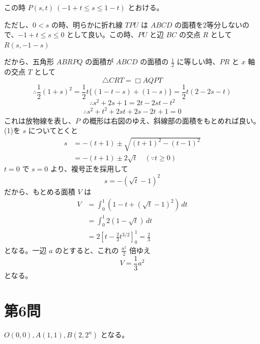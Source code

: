 \documentclass[../main.tex]{subfiles}
\begin{document}
\noindent
この時 $P(s,t) \ (-1+t \le s \le 1-t)$ とおける。

\noindent
ただし、$0 < s$ の時、明らかに折れ線 $TPU$ は $ABCD$ の面積を2等分しないので、$-1+t \le s \le 0$ として良い。この時、$PU$ と辺 $BC$ の交点 $R$ として $R(s, -1-s)$

\noindent
だから、五角形 $ABRPQ$ の面積が $ABCD$ の面積の $\frac{1}{2}$ に等しい時、$PR$ と $x$ 軸の交点 $T$ として
\[
  \triangle CRT = \Box AQPT
\]
\[
  \therefore \frac{1}{2}(1+s)^2 = \frac{1}{2} t \{ (1-t-s) + (1-s) \} = \frac{1}{2} t (2 - 2s - t)
\]
\[
  \therefore s^2 + 2s + 1 = 2t - 2st - t^2
\]
\begin{align}
  \therefore s^2 + t^2 + 2st + 2s - 2t + 1 = 0 \tag{1}
\end{align}
これは放物線を表し、$P$ の概形は右図のゆえ、斜線部の面積をもとめれば良い。(1)を $s$ についてとくと
\begin{align*}
  s &= -(t+1) \pm \sqrt{(t+1)^2 - (t-1)^2} \\
  &= -(t+1) \pm 2\sqrt{t} \quad (\because t \ge 0)
\end{align*}
$t=0$ で $s=0$ より、複号正を採用して
\[
  s = -(\sqrt{t} - 1)^2
\]
だから、もとめる面積 $V$ は
\begin{align*}
  V &= \int_0^1 (1 - t + (\sqrt{t}-1)^2) \, dt \\
  &= \int_0^1 2(1-\sqrt{t}) \, dt \\
  &= 2 \left[ t - \frac{2}{3} t^{3/2} \right]_0^1 = \frac{2}{3}
\end{align*}
となる。一辺 $a$ のとすると、これの $\frac{a^2}{2}$ 倍ゆえ
\[
  V = \frac{1}{3} a^2
\]
となる。

\newpage

\section*{第6問}

\noindent
[\textbf{解}] $O(0,0), A(1,1), B(2, 2^n)$ となる。
\end{document}
